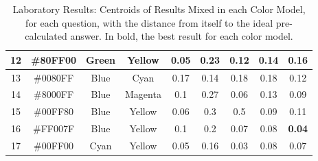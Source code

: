 \begin{table}[htbp]
{\begin{tabular}{@{}ccccccccc@{}}
    \multicolumn{1}{|c|}{12} & \multicolumn{1}{c|}{\cellcolor[HTML]{80FF00}\#80FF00} & \multicolumn{1}{c|}{Green}   & \multicolumn{1}{c||}{Yellow}  & \multicolumn{1}{c|}{0.05}          & \multicolumn{1}{c|}{0.23}         & \multicolumn{1}{c|}{0.12}          & \multicolumn{1}{c|}{0.14}          & \multicolumn{1}{c|}{0.16}          \\ \midrule
    \multicolumn{1}{|c|}{13} & \multicolumn{1}{c|}{\cellcolor[HTML]{0080FF}\#0080FF} & \multicolumn{1}{c|}{Blue}    & \multicolumn{1}{c||}{Cyan}    & \multicolumn{1}{c|}{0.17}          & \multicolumn{1}{c|}{0.14}         & \multicolumn{1}{c|}{0.18}          & \multicolumn{1}{c|}{0.18}          & \multicolumn{1}{c|}{0.12}          \\ \midrule
    \multicolumn{1}{|c|}{14} & \multicolumn{1}{c|}{\cellcolor[HTML]{8000FF}\#8000FF} & \multicolumn{1}{c|}{Blue}    & \multicolumn{1}{c||}{Magenta} & \multicolumn{1}{c|}{0.1}           & \multicolumn{1}{c|}{0.27}         & \multicolumn{1}{c|}{0.06}          & \multicolumn{1}{c|}{0.13}          & \multicolumn{1}{c|}{0.09}          \\ \midrule
    \multicolumn{1}{|c|}{15} & \multicolumn{1}{c|}{\cellcolor[HTML]{00FF80}\#00FF80} & \multicolumn{1}{c|}{Blue}    & \multicolumn{1}{c||}{Yellow}  & \multicolumn{1}{c|}{0.06}          & \multicolumn{1}{c|}{0.3}          & \multicolumn{1}{c|}{0.5}           & \multicolumn{1}{c|}{0.09}          & \multicolumn{1}{c|}{0.11}          \\ \midrule
    \multicolumn{1}{|c|}{16} & \multicolumn{1}{c|}{\cellcolor[HTML]{FF007F}\#FF007F} & \multicolumn{1}{c|}{Blue}    & \multicolumn{1}{c||}{Yellow}  & \multicolumn{1}{c|}{0.1}           & \multicolumn{1}{c|}{0.2}          & \multicolumn{1}{c|}{0.07}          & \multicolumn{1}{c|}{0.08}          & \multicolumn{1}{c|}{\textbf{0.04}} \\ \midrule
    \multicolumn{1}{|c|}{17} & \multicolumn{1}{c|}{\cellcolor[HTML]{00FF00}\#00FF00} & \multicolumn{1}{c|}{Cyan}    & \multicolumn{1}{c||}{Yellow}  & \multicolumn{1}{c|}{0.05}          & \multicolumn{1}{c|}{0.16}         & \multicolumn{1}{c|}{0.03}          & \multicolumn{1}{c|}{0.08}          & \multicolumn{1}{c|}{0.07}          \\ \bottomrule
    \end{tabular}}
  \caption[Laboratory Results: Centroids of Results Mixed in each Color Model]{Laboratory Results: Centroids of Results Mixed in each Color Model, for each question, with the distance from itself to the ideal pre-calculated answer. In bold, the best result for each color model.}
  \label{table:colormodels_centroids}
\end{table}
